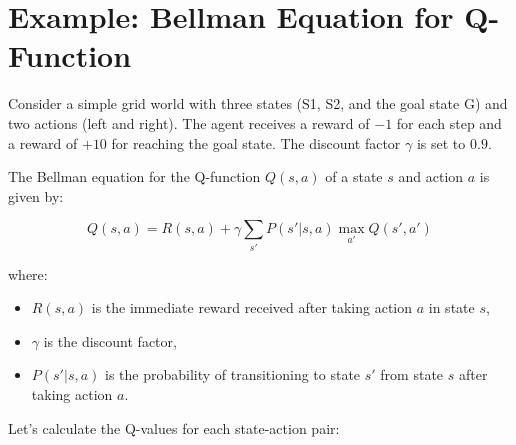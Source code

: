 \documentclass{article}
\begin{document}
\section*{Example: Bellman Equation for Q-Function}

Consider a simple grid world with three states (S1, S2, and the goal state G) and two actions (left and right). The agent receives a reward of $-1$ for each step and a reward of $+10$ for reaching the goal state. The discount factor $\gamma$ is set to $0.9$.

The Bellman equation for the Q-function $Q(s, a)$ of a state $s$ and action $a$ is given by:

\[
Q(s, a) = R(s, a) + \gamma \sum_{s'} P(s' | s, a) \max_{a'} Q(s', a')
\]

where:
\begin{itemize}
    \item $R(s, a)$ is the immediate reward received after taking action $a$ in state $s$,
    \item $\gamma$ is the discount factor,
    \item $P(s' | s, a)$ is the probability of transitioning to state $s'$ from state $s$ after taking action $a$.
\end{itemize}

Let's calculate the Q-values for each state-action pair:
\end{document}
